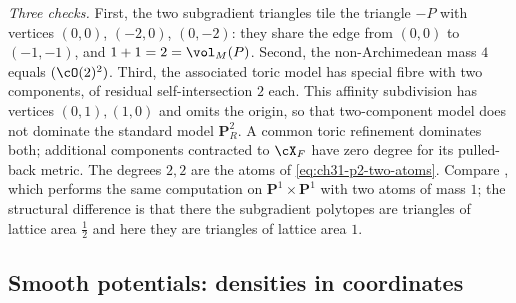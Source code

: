 \begin{example}
\emph{Three checks.}  First, the two subgradient triangles tile the triangle
$-P$ with vertices $(0,0)$, $(-2,0)$, $(0,-2)$: they share the edge
from $(0,0)$ to $(-1,-1)$, and $1+1=2=\vol_M(P)$.  Second, the
non-Archimedean mass $4$ equals $(\cO(2)^2)$.  Third, the associated
toric model has special fibre with two components, of residual
self-intersection $2$ each.  This affinity subdivision has vertices
$(0,1),(1,0)$ and omits the origin, so that two-component model does not
dominate the standard model $\mathbf P^2_R$.  A common toric refinement
dominates both; additional components contracted to $\cX_F$ have zero
degree for its pulled-back metric.  The degrees $2,2$ are the atoms of
\eqref{eq:ch31-p2-two-atoms}.  Compare
, which performs the same computation on
$\mathbf P^1\times\mathbf P^1$ with two atoms of mass $1$; the
structural difference is that there the subgradient polytopes are triangles of lattice area $\tfrac12$ and here they are triangles of lattice area $1$.
\end{example}

\subsection{Smooth potentials: densities in coordinates}
\label{sec:ch31-toric-smooth}

